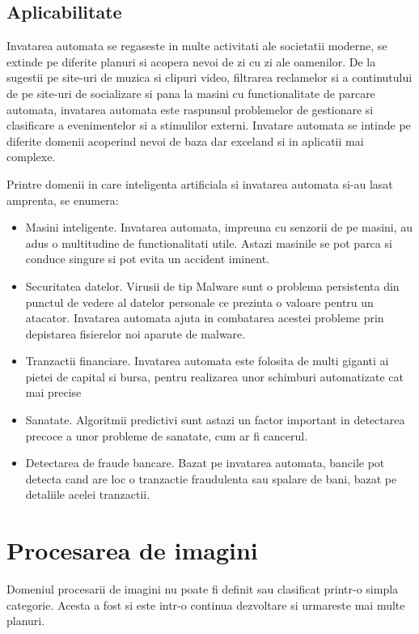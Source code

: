 	\subsection{Aplicabilitate}
	Invatarea automata se regaseste in multe activitati ale societatii moderne, se extinde pe diferite planuri si acopera nevoi de zi cu zi ale oamenilor. De la sugestii pe site-uri de muzica si clipuri video, filtrarea reclamelor si a continutului de pe site-uri de socializare  si pana la masini cu functionalitate de parcare automata, invatarea automata este raspunsul problemelor de gestionare si clasificare a evenimentelor si a stimulilor externi. 
	Invatare automata se intinde pe diferite domenii acoperind nevoi de baza dar exceland si in aplicatii mai complexe.
	
	Printre domenii in care inteligenta artificiala si invatarea automata si-au lasat amprenta, se enumera:
	
	\begin{itemize}
		\item Masini inteligente. Invatarea automata, impreuna cu senzorii de pe masini, au adus o multitudine de functionalitati utile. Astazi masinile se pot parca si conduce singure si pot evita un accident iminent.
		
		\item Securitatea datelor. Virusii de tip Malware sunt o problema persistenta din punctul de vedere al datelor personale ce prezinta o valoare pentru un atacator. Invatarea automata ajuta in combatarea acestei probleme prin depistarea fisierelor noi aparute de malware.
		
		\item Tranzactii financiare. Invatarea automata este folosita de multi giganti ai pietei de capital si bursa, pentru realizarea unor schimburi automatizate cat mai precise
		
		\item Sanatate. Algoritmii predictivi sunt astazi un factor important in detectarea precoce a unor probleme de sanatate, cum ar fi cancerul.
		
		\item Detectarea de fraude bancare. Bazat pe invatarea automata, bancile pot detecta cand are loc o tranzactie fraudulenta sau spalare de bani, bazat pe detaliile acelei tranzactii.			
	\end{itemize}
	
	\vfill
	
	
	\section{Procesarea de imagini}
	Domeniul procesarii de imagini nu poate fi definit sau clasificat printr-o simpla categorie. Acesta a fost si este intr-o continua dezvoltare si urmareste mai multe planuri. 
	

